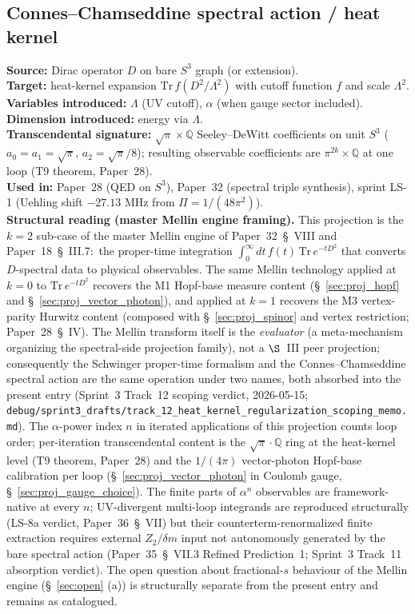 \documentclass[11pt]{article}
\begin{document}
\subsection{Connes--Chamseddine spectral action / heat kernel}
\label{sec:proj_spectral_action}
\textbf{Source:} Dirac operator $D$ on bare $S^3$ graph (or
extension).\\
\textbf{Target:} heat-kernel expansion
$\mathrm{Tr}\, f(D^2/\Lambda^2)$ with cutoff function $f$ and scale
$\Lambda^2$.\\
\textbf{Variables introduced:} $\Lambda$ (UV cutoff), $\alpha$ (when
gauge sector included).\\
\textbf{Dimension introduced:} energy via $\Lambda$.\\
\textbf{Transcendental signature:} $\sqrt{\pi} \times \mathbb{Q}$
Seeley--DeWitt coefficients on unit $S^3$ ($a_0 = a_1 = \sqrt{\pi}$,
$a_2 = \sqrt{\pi}/8$); resulting observable coefficients are
$\pi^{2k} \times \mathbb{Q}$ at one loop (T9 theorem, Paper~28).\\
\textbf{Used in:} Paper~28 (QED on $S^3$), Paper~32 (spectral triple
synthesis), sprint LS-1 (Uehling shift $-27.13$ MHz from
$\Pi = 1/(48\pi^2)$).\\
\textbf{Structural reading (master Mellin engine framing).}  This
projection is the $k=2$ sub-case of the master Mellin engine of
Paper~32~\S~VIII and Paper~18~\S~III.7:\ the proper-time integration
$\int_0^\infty dt\, f(t)\,\mathrm{Tr}\,e^{-tD^2}$ that converts $D$-spectral
data to physical observables.  The same Mellin technology applied
at $k=0$ to $\mathrm{Tr}\,e^{-tD^2}$ recovers the M1 Hopf-base measure
content (\S~\ref{sec:proj_hopf} and \S~\ref{sec:proj_vector_photon}),
and applied at $k=1$ recovers the M3 vertex-parity Hurwitz content
(composed with \S~\ref{sec:proj_spinor} and vertex restriction;
Paper~28~\S~IV).  The Mellin transform itself is the
\emph{evaluator} (a meta-mechanism organizing the spectral-side
projection family), not a $\S$~III peer projection; consequently the
Schwinger proper-time formalism and the Connes--Chamseddine spectral
action are the same operation under two names, both absorbed into the
present entry (Sprint~3 Track~12 scoping verdict, 2026-05-15;
\texttt{debug/sprint3\_drafts/track\_12\_heat\_kernel\_regularization\_scoping\_memo.md}).
The $\alpha$-power index $n$ in iterated applications of this projection
counts loop order; per-iteration transcendental content is the
$\sqrt{\pi}\cdot\mathbb{Q}$ ring at the heat-kernel level (T9 theorem,
Paper~28) and the $1/(4\pi)$ vector-photon Hopf-base calibration per
loop (\S~\ref{sec:proj_vector_photon} in Coulomb gauge, \S~\ref{sec:proj_gauge_choice}).
The finite parts of $\alpha^n$ observables are framework-native at every
$n$; UV-divergent multi-loop integrands are reproduced structurally
(LS-8a verdict, Paper~36~\S~VII) but their counterterm-renormalized
finite extraction requires external $Z_2/\delta m$ input not
autonomously generated by the bare spectral action (Paper~35~\S~VII.3
Refined Prediction~1; Sprint~3 Track~11 absorption verdict).  The open
question about fractional-$s$ behaviour of the Mellin engine
(\S~\ref{sec:open} (a)) is structurally separate from the present
entry and remains as catalogued.
\end{document}
